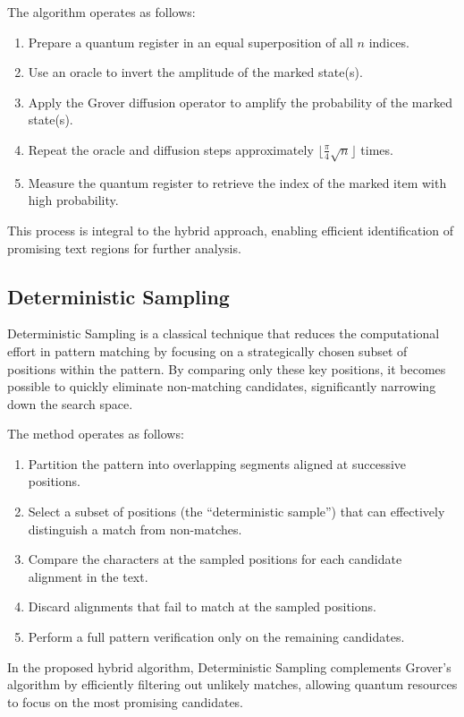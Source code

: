 \documentclass[12pt]{article}
\begin{document}
The algorithm operates as follows:
\begin{enumerate}
    \item Prepare a quantum register in an equal superposition of all \(n\) indices.
    \item Use an oracle to invert the amplitude of the marked state(s).
    \item Apply the Grover diffusion operator to amplify the probability of the marked state(s).
    \item Repeat the oracle and diffusion steps approximately \(\lfloor \frac{\pi}{4}\sqrt{n} \rfloor\) times.
    \item Measure the quantum register to retrieve the index of the marked item with high probability.
\end{enumerate}
This process is integral to the hybrid approach, enabling efficient identification of promising text regions for further analysis.

\subsection*{Deterministic Sampling}
Deterministic Sampling is a classical technique that reduces the computational effort in pattern matching by focusing on a strategically chosen subset of positions within the pattern. By comparing only these key positions, it becomes possible to quickly eliminate non-matching candidates, significantly narrowing down the search space.

The method operates as follows:
\begin{enumerate}
    \item Partition the pattern into overlapping segments aligned at successive positions.
    \item Select a subset of positions (the ``deterministic sample'') that can effectively distinguish a match from non-matches.
    \item Compare the characters at the sampled positions for each candidate alignment in the text.
    \item Discard alignments that fail to match at the sampled positions.
    \item Perform a full pattern verification only on the remaining candidates.
\end{enumerate}
In the proposed hybrid algorithm, Deterministic Sampling complements Grover's algorithm by efficiently filtering out unlikely matches, allowing quantum resources to focus on the most promising candidates.
\end{document}
